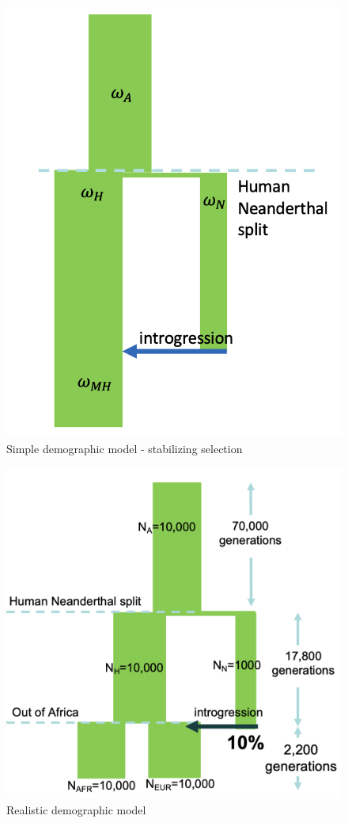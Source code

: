 \begin{figure}[htb]
    \centering
    \includegraphics[width=\textwidth]{chapter5/figures/fig5.3.png}
    \caption{Simple demographic model - stabilizing selection}
    \label{fig:5.3}
\end{figure}

\begin{figure}[htb]
    \centering
    \includegraphics[width=\textwidth]{chapter5/figures/fig5.4.png}
    \caption{Realistic demographic model}
    \label{fig:5.4}
\end{figure}

